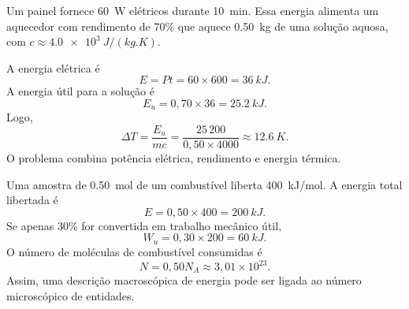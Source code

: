 \documentclass[11pt,a4paper,oneside]{book}
\begin{document}
\begin{exemplo}[title=Exemplo integrador resolvido -- aquecer uma solução com energia solar]
Um painel fornece \SI{60}{W} elétricos durante \SI{10}{min}. Essa energia alimenta um aquecedor com rendimento de 70\% que aquece \SI{0.50}{kg} de uma solução aquosa, com $c\approx\SI{4.0e3}{J/(kg.K)}$.

A energia elétrica é
\[
E=Pt=60\times600=\SI{36}{kJ}.
\]
A energia útil para a solução é
\[
E_u=0{,}70\times36=\SI{25.2}{kJ}.
\]
Logo,
\[
\Delta T=\frac{E_u}{mc}
=\frac{25\,200}{0{,}50\times4000}
\approx\SI{12.6}{K}.
\]
O problema combina potência elétrica, rendimento e energia térmica.
\end{exemplo}

\begin{exemplo}[title={Exemplo integrador resolvido -- combustível, moléculas e energia}]
Uma amostra de \SI{0.50}{mol} de um combustível liberta \SI{400}{kJ/mol}. A energia total libertada é
\[
E=0{,}50\times400=\SI{200}{kJ}.
\]
Se apenas 30\% for convertida em trabalho mecânico útil,
\[
W_u=0{,}30\times200=\SI{60}{kJ}.
\]
O número de moléculas de combustível consumidas é
\[
N=0{,}50N_A\approx3{,}01\times10^{23}.
\]
Assim, uma descrição macroscópica de energia pode ser ligada ao número microscópico de entidades.
\end{exemplo}
\end{document}

